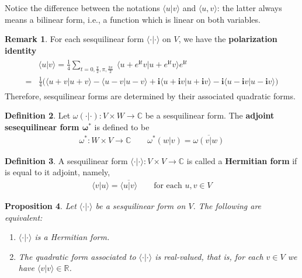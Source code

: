 \documentclass[12pt,b5paper,notitlepage]{article}
\theoremstyle{definition}
\newtheorem{df}{Definition}[section]
\newtheorem{rem}[df]{Remark}
\theoremstyle{plain}
\newtheorem{pp}[df]{Proposition}
\newcommand{\ovl}{\overline}
\newcommand{\bk}[1]{\langle {#1}\rangle}
\newcommand{\im}{\mathbf{i}}
\newcommand{\Cbb}{\mathbb C}
\newcommand{\Rbb}{\mathbb R}
\numberwithin{equation}{section}
\begin{document}
Notice the difference between the notations $\bk{u|v}$ and $\bk{u,v}$: the latter always means a bilinear form, i.e., a function which is linear on both variables.


\begin{rem}
For each sesquilinear form $\bk{\cdot|\cdot}$ on $V$, we have the \textbf{polarization identity} 
\begin{align}
\begin{aligned}
&\bk{u|v}=\frac 14\sum_{t=0,\frac \pi 2,\pi,\frac{3\pi}2}~ \bk{u+e^{\im t}v|u+e^{\im t}v}e^{\im t}\\
=&\frac 14\Big(\bk{u+v|u+v}-\bk{u-v|u-v}+\im\bk{u+\im v|u+\im v}-\im\bk{u-\im v|u-\im v}\Big)
\end{aligned}
\end{align}
Therefore, sesquilinear forms are determined by their associated quadratic forms.
\end{rem}



\begin{df}
Let $\omega(\cdot|\cdot):V\times W\rightarrow\Cbb$ be a sesquilinear form. The \textbf{adjoint sesequilinear form $\pmb{\omega^*}$}   is defined to be
\begin{align*}
\omega^*:W\times V\rightarrow\Cbb\qquad \omega^*(w|v)=\ovl{\omega(v|w)}
\end{align*}
\end{df}


\begin{df}
A sesquilinear form $\bk{\cdot|\cdot}:V\times V\rightarrow\Cbb$ is called a \textbf{Hermitian form}  if is equal to it adjoint, namely, 
\begin{align*}
\bk{v|u}=\ovl{\bk{u|v}}\qquad\text{for each }u,v\in V
\end{align*}
\end{df}



\begin{pp}\label{lb113}
Let $\bk{\cdot|\cdot}$ be a sesquilinear form on $V$. The following are equivalent:
\begin{enumerate}[label=(\arabic*)]
\item $\bk{\cdot|\cdot}$ is a Hermitian form.
\item The quadratic form associated to $\bk{\cdot|\cdot}$ is real-valued, that is, for each $v\in V$ we have $\bk{v|v}\in\Rbb$.
\end{enumerate}
\end{pp}
\end{document}
